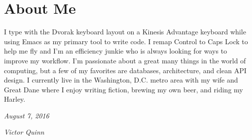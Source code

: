 \documentclass[]{friggeri-cv}
\begin{document}
\section{About Me}
I type with the Dvorak keyboard layout on a Kinesis Advantage keyboard while using Emacs as my primary tool to write code. I remap Control to Caps Lock to help me fly and I'm an efficiency junkie who is always looking for ways to improve my workflow. I'm passionate about a great many things in the world of computing, but a few of my favorites are databases, architecture, and clean API design. I currently live in the Washington, D.C. metro area with my wife and Great Dane where I enjoy writing fiction, brewing my own beer, and riding my Harley.
\\
\begin{flushleft}
\emph{August 7, 2016}
\end{flushleft}
\begin{flushright}
\emph{Victor Quinn}
\end{flushright}
\end{document}
